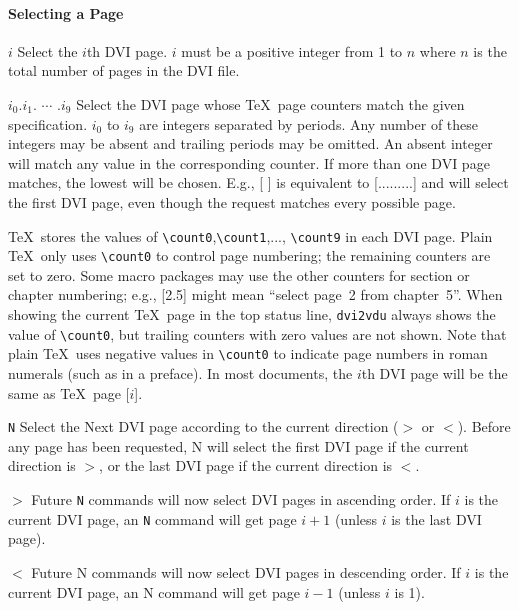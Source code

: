 \paragraph{Selecting a Page}

\begin{list}%
{}%
{\settowidth{\labelwidth}{\tt $i_0$.$i_1$. $\cdots$ .$i_9$}
\settowidth{\labelsep}{aaaa}
\settowidth{\rightmargin}{aaa}
\addtolength{\labelwidth}{\labelsep}
\setlength{\leftmargin}{\labelwidth}}

\item[$i$]Select the $i$th DVI page.  $i$ must be a positive integer from
1 to $n$ where $n$ is the total number of pages in the DVI file.

\item[$i_0$.$i_1$. $\cdots$ .$i_9$]
Select the DVI page whose \TeX\ page counters match the given specification.
$i_0$ to $i_9$ are integers separated by periods.  Any number of these
integers may be absent and trailing periods may be omitted.
An absent integer will match any value in the corresponding counter.
If more than one DVI page matches, the lowest will be chosen.
E.g., [ ] is equivalent to [.........] and will select the first DVI page,
even though the request matches every possible page.

\TeX\ stores the values of \hbox{\verb|\count0|},\hbox{\verb|\count1|},...,
\hbox{\verb|\count9|} in each DVI page. Plain \TeX\ only uses
\hbox{\verb|\count0|} to control page numbering; the remaining counters are set
to zero. Some macro packages may use the other counters for section or chapter
numbering; e.g., [2.5] might mean ``select page~2 from chapter~5''. When
showing the current \TeX\ page in the top status line, {{\tt dvi2vdu}} always shows
the value of \hbox{\verb|\count0|}, but trailing counters with zero values are
not shown. Note that plain \TeX\ uses negative values in  \hbox{\verb|\count0|}
to indicate page numbers in roman numerals (such as in a preface). In most
documents, the $i$th DVI page will be the same as \TeX\ page [$i$].


\item[\tt N]
Select the Next DVI page according to the current direction ($>$ or $<$).
Before any page has been requested,
N will select the first DVI page if the current direction is $>$, or
the last DVI page if the current direction is $<$.

\item[$>$]
Future {\tt N} commands will now select DVI pages in ascending order.
If $i$ is the current DVI page,
an {\tt N} command will get page $i+1$ (unless $i$ is the last DVI page).

\item[$<$]
Future N commands will now select DVI pages in descending order.
If $i$ is the current DVI page,
an N command will get page $i-1$ (unless $i$ is 1).
\end{list}

